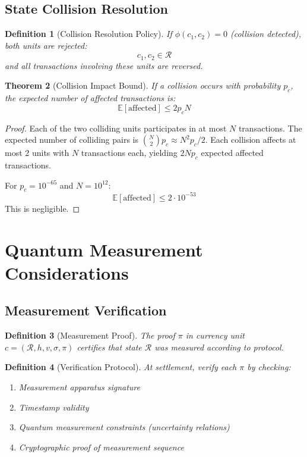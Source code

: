 \documentclass[12pt]{article}
\newtheorem{theorem}{Theorem}
\newtheorem{definition}[theorem]{Definition}
\begin{document}
\subsection{State Collision Resolution}

\begin{definition}[Collision Resolution Policy]
If $\phi(c_1, c_2) = 0$ (collision detected), both units are rejected:
$$
c_1, c_2 \in \mathcal{R}
$$
and all transactions involving these units are reversed.
\end{definition}

\begin{theorem}[Collision Impact Bound]
If a collision occurs with probability $p_c$, the expected number of affected transactions is:
$$
\mathbb{E}[\text{affected}] \leq 2p_c N
$$
\end{theorem}

\begin{proof}
Each of the two colliding units participates in at most $N$ transactions. The expected number of colliding pairs is $\binom{N}{2}p_c \approx N^2p_c/2$. Each collision affects at most 2 units with $N$ transactions each, yielding $2Np_c$ expected affected transactions.

For $p_c = 10^{-65}$ and $N = 10^{12}$:
$$
\mathbb{E}[\text{affected}] \leq 2 \cdot 10^{-53}
$$
This is negligible.
\end{proof}

\section{Quantum Measurement Considerations}

\subsection{Measurement Verification}

\begin{definition}[Measurement Proof]
The proof $\pi$ in currency unit $c = (\mathcal{R}, h, v, \sigma, \pi)$ certifies that state $\mathcal{R}$ was measured according to protocol.
\end{definition}

\begin{definition}[Verification Protocol]
At settlement, verify each $\pi$ by checking:
\begin{enumerate}
    \item Measurement apparatus signature
    \item Timestamp validity
    \item Quantum measurement constraints (uncertainty relations)
    \item Cryptographic proof of measurement sequence
\end{enumerate}
\end{definition}
\end{document}
